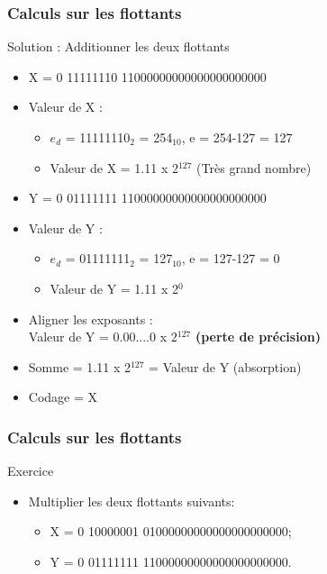 \documentclass{beamer}
\begin{document}
\begin{frame}
	\frametitle{Calculs sur les flottants}
	
	\begin{block}{Solution : Additionner les deux flottants}
		\begin{itemize}
			\item X = 0 11111110 11000000000000000000000
			\item Valeur de X :
			\begin{itemize}
				\item $e_d$ = 11111110$_2$ = 254$_{10}$, e = 254-127 = 127
				\item Valeur de X = 1.11 x 2$^{127}$ (Très grand nombre)
			\end{itemize}
			
			\item Y = 0 01111111 11000000000000000000000
			\item Valeur de Y :
			\begin{itemize}
				\item $e_d$ = 01111111$_2$ = 127$_{10}$, e = 127-127 = 0
				\item Valeur de Y = 1.11 x 2$^{0}$
			\end{itemize}
			\item Aligner les exposants :\\ Valeur de Y = 0.00....0 x 2$^{127}$
			\textbf{(perte de précision)}
			\item Somme = 1.11 x 2$^{127}$ = Valeur de Y (absorption)
			\item Codage = X
		\end{itemize}
	\end{block}
\end{frame}

\begin{frame}
	\frametitle{Calculs sur les flottants}
	
	\begin{block}{Exercice}
		\begin{itemize}
			\item Multiplier les deux flottants suivants:
			\begin{itemize}
				\item X = 0 10000001 01000000000000000000000;
				\item Y = 0 01111111 11000000000000000000000.
			\end{itemize}
		\end{itemize}
	\end{block}
\end{frame}
\end{document}
